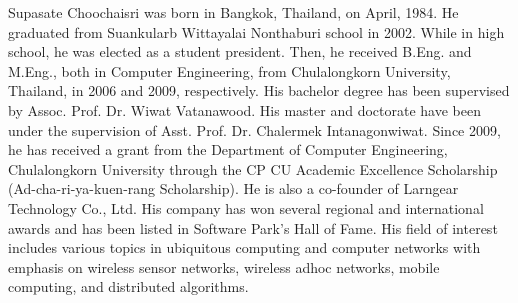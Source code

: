 \begin{biography}
Supasate Choochaisri was born in Bangkok, Thailand, on April, 1984.
He graduated from Suankularb Wittayalai Nonthaburi school in 2002. While in high school, he was elected as a student president. 
Then, he received B.Eng. and M.Eng., both in Computer Engineering, from Chulalongkorn University, Thailand, in 2006 and 2009, respectively.
His bachelor degree has been supervised by Assoc. Prof. Dr. Wiwat Vatanawood.
His master and doctorate have been under the supervision of Asst. Prof. Dr. Chalermek Intanagonwiwat.
Since 2009, he has received a grant from the Department of Computer Engineering, Chulalongkorn University through the CP CU Academic Excellence Scholarship (Ad-cha-ri-ya-kuen-rang Scholarship).
He is also a co-founder of Larngear Technology Co., Ltd. His company has won several regional and international awards and has been listed in Software Park's Hall of Fame.
His field of interest includes various topics in ubiquitous computing and computer networks with emphasis on wireless sensor networks, wireless adhoc networks, mobile computing, and distributed algorithms.
\end{biography}
